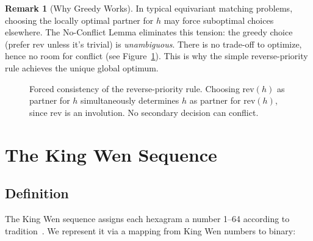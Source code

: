 \documentclass[11pt]{article}
\theoremstyle{definition}
\newtheorem{remark}[definition]{Remark}
\theoremstyle{plain}
\newcommand{\rev}{\mathrm{rev}}
\begin{document}
\begin{remark}[Why Greedy Works]
In typical equivariant matching problems, choosing the locally optimal partner for $h$ may force suboptimal choices elsewhere. The No-Conflict Lemma eliminates this tension: the greedy choice (prefer $\rev$ unless it's trivial) is \emph{unambiguous}. There is no trade-off to optimize, hence no room for conflict (see Figure~\ref{fig:consistency}). This is why the simple reverse-priority rule achieves the unique global optimum.
\end{remark}

\begin{figure}[ht]
\centering
{}
\caption{Forced consistency of the reverse-priority rule. Choosing $\rev(h)$ as partner for $h$ simultaneously determines $h$ as partner for $\rev(h)$, since $\rev$ is an involution. No secondary decision can conflict.}
\label{fig:consistency}
\end{figure}

\section{The King Wen Sequence}

\subsection{Definition}

The King Wen sequence assigns each hexagram a number 1--64 according to tradition~\cite{wilhelm1967}. We represent it via a mapping from King Wen numbers to binary:
\end{document}
